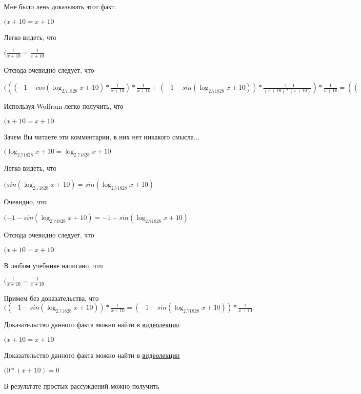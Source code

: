 \documentclass[12pt,a4paper,fleqn]{article}
\theoremstyle{definition}
\begin{document}
Мне было лень доказывать этот факт.

$( x  +  10  =  x  +  10 $

Легко видеть, что

$(\frac{ 1 }{ x  +  10 }
 = \frac{ 1 }{ x  +  10 }
$

Отсюда очевидно следует, что

$((( -1  - cos(\log_{ 2.71828 }{ x  +  10 }) * \frac{ 1 }{ x  +  10 }
) * \frac{ 1 }{ x  +  10 }
 + ( -1  - sin(\log_{ 2.71828 }{ x  +  10 })) * \frac{ -1  -  1 }{( x  +  10 ) * ( x  +  10 )}
) * \frac{ 1 }{ x  +  10 }
 = (( -1  - cos(\log_{ 2.71828 }{ x  +  10 }) * \frac{ 1 }{ x  +  10 }
) * \frac{ 1 }{ x  +  10 }
 + ( -1  - sin(\log_{ 2.71828 }{ x  +  10 })) * \frac{ -1  -  1 }{( x  +  10 ) * ( x  +  10 )}
) * \frac{ 1 }{ x  +  10 }
$

Используя Wolfram легко получить, что

$( x  +  10  =  x  +  10 $

Зачем Вы читаете эти комментарии, в них нет никакого смысла...

$(\log_{ 2.71828 }{ x  +  10 } = \log_{ 2.71828 }{ x  +  10 }$

Легко видеть, что

$(sin(\log_{ 2.71828 }{ x  +  10 }) = sin(\log_{ 2.71828 }{ x  +  10 })$

Очевидно, что

$( -1  - sin(\log_{ 2.71828 }{ x  +  10 }) =  -1  - sin(\log_{ 2.71828 }{ x  +  10 })$

Отсюда очевидно следует, что

$( x  +  10  =  x  +  10 $

В любом учебнике написано, что

$(\frac{ 1 }{ x  +  10 }
 = \frac{ 1 }{ x  +  10 }
$

Примем без доказательства, что
$(( -1  - sin(\log_{ 2.71828 }{ x  +  10 })) * \frac{ 1 }{ x  +  10 }
 = ( -1  - sin(\log_{ 2.71828 }{ x  +  10 })) * \frac{ 1 }{ x  +  10 }
$

Доказательство данного факта можно найти в \href{https://www.youtube.com/watch?v=dQw4w9WgXcQ}{видеолекции}

$( x  +  10  =  x  +  10 $

Доказательство данного факта можно найти в \href{https://www.youtube.com/watch?v=dQw4w9WgXcQ}{видеолекции}

$( 0  * ( x  +  10 ) =  0 $

В результате простых рассуждений можно получить
\end{document}
